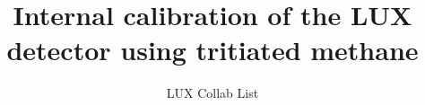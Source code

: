 \documentclass[12pt,twocolumn]{article}
\begin{document}
\title{Internal calibration of the LUX detector using tritiated methane}
\author{LUX Collab List}

\twocolumn[
\begin{@twocolumnfalse}
\maketitle



\end{@twocolumnfalse}
]













{}


\end{document}
